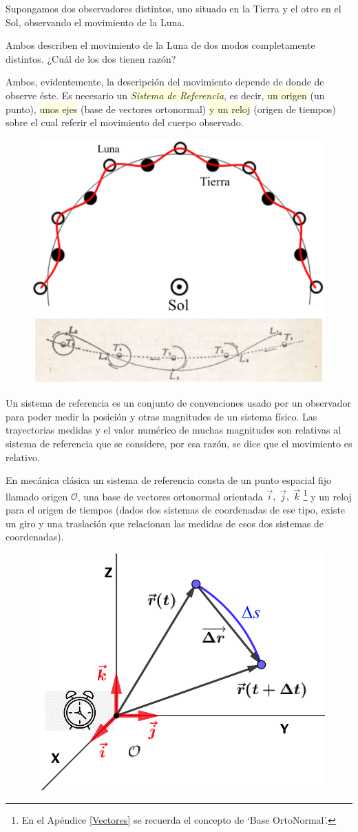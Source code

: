 \begin{multicols}{2}
Supongamos dos observadores distintos, uno situado en la Tierra y el otro en el Sol, observando el movimiento de la Luna.

Ambos describen el movimiento de la Luna de dos modos completamente distintos. ¿Cuál de los dos tienen razón?

Ambos, evidentemente, la descripción del movimiento depende de donde de observe éste. Es necesario un \colorbox{LightYellow}{\emph{Sistema de Referencia}}, es decir,  \colorbox{LightYellow}{un origen} (un punto),  \colorbox{LightYellow}{unos ejes} (base de vectores ortonormal)  \colorbox{LightYellow}{y un reloj} (origen de tiempos) sobre el cual referir el movimiento del cuerpo observado.
\begin{figure}[H]
		\centering
		\includegraphics[width=.5\textwidth]{imagenes/imagenes02/T02IM01.png}
	\end{figure}
\end{multicols}

Un sistema de referencia es un conjunto de convenciones usado por un observador para poder medir la posición y otras magnitudes de un sistema físico. Las trayectorias medidas y el valor numérico de muchas magnitudes son relativas al sistema de referencia que se considere, por esa razón, se dice que el movimiento es relativo.

\begin{multicols}{2}
En mecánica clásica un sistema de referencia consta de un punto espacial fijo llamado origen $\mathcal O$, una base de vectores ortonormal orientada $\vec i,\; \vec j,\; \vec k$ \footnote{En el Apéndice \ref{Vectores} se recuerda el concepto de `Base OrtoNormal'.}  y un reloj para el origen de tiempos (dados dos sistemas de coordenadas de ese tipo, existe un giro y una traslación que relacionan las medidas de esos dos sistemas de coordenadas).
\begin{figure}[H]
		\centering
		\includegraphics[width=.35\textwidth]{imagenes/imagenes02/T02IM02.png}
	\end{figure}
\end{multicols}

